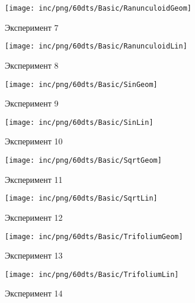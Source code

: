 \begin{figure}  
	\begin{minipage}{0,5\textwidth}
		\texttt{[image: inc/png/60dts/Basic/RanunculoidGeom]}
		\label{fig:app1}
		\caption{Эксперимент 7}
	\end{minipage}
	\begin{minipage}{0,5\textwidth}
		\texttt{[image: inc/png/60dts/Basic/RanunculoidLin]}
		\label{fig:app2}
		\caption{Эксперимент 8}
	\end{minipage}
	
	\begin{minipage}{0,5\textwidth}
		\texttt{[image: inc/png/60dts/Basic/SinGeom]}
		\label{fig:app1}
		\caption{Эксперимент 9}
	\end{minipage}
	\begin{minipage}{0,5\textwidth}
		\texttt{[image: inc/png/60dts/Basic/SinLin]}
		\label{fig:app2}
		\caption{Эксперимент 10}
	\end{minipage}
	
	\begin{minipage}{0,5\textwidth}
		\texttt{[image: inc/png/60dts/Basic/SqrtGeom]}
		\label{fig:app1}
		\caption{Эксперимент 11}
	\end{minipage}
	\begin{minipage}{0,5\textwidth}
		\texttt{[image: inc/png/60dts/Basic/SqrtLin]}
		\label{fig:app2}
		\caption{Эксперимент 12}
	\end{minipage}
	
	\begin{minipage}{0,5\textwidth}
		\texttt{[image: inc/png/60dts/Basic/TrifoliumGeom]}
		\label{fig:app1}
		\caption{Эксперимент 13}
	\end{minipage}
	\begin{minipage}{0,5\textwidth}
		\texttt{[image: inc/png/60dts/Basic/TrifoliumLin]}
		\label{fig:app2}
		\caption{Эксперимент 14}
	\end{minipage}
\end{figure}
\clearpage


